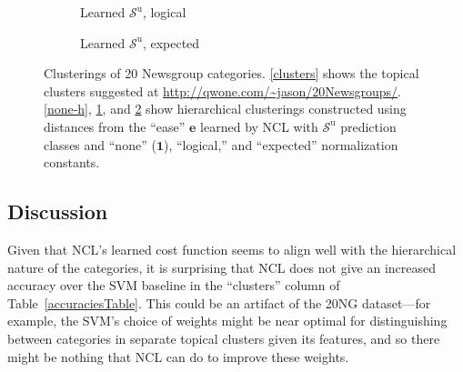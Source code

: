 \documentclass{article} %
\newcommand{\unorderedS}{\mathcal{S}^{\mathrm{u}}}
\newcommand{\ourmethod}{NCL}
\begin{document}
\begin{figure}
\begin{subfigure}{.5\textwidth}
\begin{tikzpicture}
\end{tikzpicture}
\caption{Learned $\unorderedS$, logical}
\label{logical-h}
\end{subfigure}%
\begin{subfigure}{.5\textwidth}
\centering
{}
\caption{Learned $\unorderedS$, expected}
\label{expected-h}
\end{subfigure}
\caption{Clusterings of 20 Newsgroup categories.  \ref{clusters} shows
the topical clusters suggested at \url{http://qwone.com/~jason/20Newsgroups/}.
\ref{none-h}, \ref{logical-h}, and \ref{expected-h} show hierarchical
clusterings constructed using distances from the ``ease'' $\mathbf{e}$ 
learned by \ourmethod{} with $\unorderedS$ prediction classes and
``none'' ($\mathbf{1}$), ``logical,'' and ``expected'' normalization
constants.
\label{hierarchies}}
\end{figure}

\subsection{Discussion}

Given that \ourmethod{}'s learned cost function seems to align well
with the hierarchical nature of the categories,
it is surprising that \ourmethod{} does not give an increased 
accuracy over the SVM baseline in the ``clusters'' column of
 Table~\ref{accuraciesTable}.
This could be an artifact of the 20NG dataset---for example,
the SVM's choice of weights might be near optimal for 
distinguishing between categories in separate topical clusters
given its features, and so there might be nothing that \ourmethod{}
can do to improve these weights. 
\end{document}
